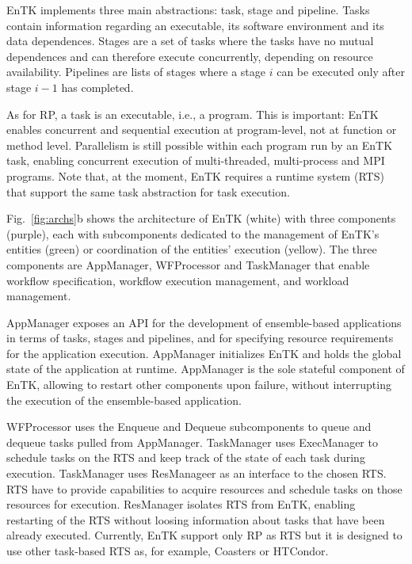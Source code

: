 \documentclass[preprint,12pt, a4paper]{elsarticle}
\begin{document}
EnTK implements three main abstractions: task, stage and pipeline. Tasks
contain information regarding an executable, its software environment and its
data dependences. Stages are a set of tasks where the tasks have no mutual
dependences and can therefore execute concurrently, depending on resource
availability. Pipelines are lists of stages where a stage \(i\) can be
executed only after stage \(i-1\) has completed.

As for RP, a task is an executable, i.e., a program.  This is important: EnTK enables concurrent and
sequential execution at program-level, not at function or method level.
Parallelism is still possible within each program run by an EnTK task,
enabling concurrent execution of multi-threaded, multi-process and MPI
programs. Note that, at the moment, EnTK requires a runtime system (RTS) that
support the same task abstraction for task execution.

Fig.~\ref{fig:archs}b shows the architecture of EnTK (white) with three
components (purple), each with subcomponents dedicated to the management of
EnTK's entities (green) or coordination of the entities' execution (yellow).
The three components are AppManager, WFProcessor and TaskManager that enable
workflow specification, workflow execution management, and workload
management.

AppManager exposes an API for the development of ensemble-based applications
in terms of tasks, stages and pipelines, and for specifying resource
requirements for the application execution. AppManager initializes EnTK and
holds the global state of the application at runtime. AppManager is the sole
stateful component of EnTK, allowing to restart other components upon
failure, without interrupting the execution of the ensemble-based
application.

WFProcessor uses the Enqueue and Dequeue subcomponents to queue and dequeue
tasks pulled from AppManager. TaskManager uses ExecManager to schedule tasks
on the RTS and keep track of the state of each task during execution.
TaskManager uses ResManageer as an interface to the chosen RTS. RTS have to
provide capabilities to acquire resources and schedule tasks on those
resources for execution. ResManager isolates RTS from EnTK, enabling
restarting of the RTS without loosing information about tasks that have been
already executed. Currently, EnTK support only RP as RTS but it is designed
to use other task-based RTS as, for example, Coasters or HTCondor.
\end{document}
